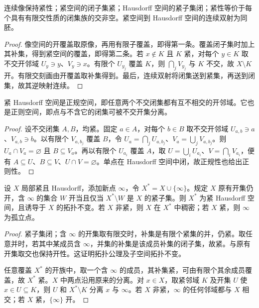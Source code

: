 \begin{proposition}[紧性的基本性质]\label{prop:y0-compact}
连续像保持紧性；紧空间的闭子集紧；Hausdorff 空间的紧子集闭；紧性等价于每个具有有限交性质的闭集族的交非空。紧空间到 Hausdorff 空间的连续双射为同胚。
\end{proposition}
\begin{proof}
像空间的开覆盖取原像，再用有限子覆盖，即得第一条。覆盖闭子集时加上其补集，得到紧空间的覆盖，即得第二条。若 $x\notin K$ 且 $K$ 紧，对每个 $y\in K$ 取不交开邻域 $U_y\ni y$、$V_y\ni x$。有限个 $U_{y_j}$ 覆盖 $K$，则 $\bigcap_jV_{y_j}$ 与 $K$ 不交，故 $X\setminus K$ 开。有限交刻画由开覆盖取补集得到。最后，连续双射将闭集送到紧集，再送到闭集，故其逆映射连续。
\end{proof}

\begin{proposition}\label{prop:y0-normal}
紧 Hausdorff 空间是正规空间，即任意两个不交闭集都有互不相交的开邻域。它也是正则空间，即点与不含它的闭集可被不交开集分离。
\end{proposition}
\begin{proof}
设不交闭集 $A,B$，均紧。固定 $a\in A$，对每个 $b\in B$ 取不交开邻域 $U_{a,b}\ni a$、$V_{a,b}\ni b$。以有限个 $V_{a,b_j}$ 覆盖 $B$，令 $U_a=\bigcap_jU_{a,b_j}$、$V_a=\bigcup_jV_{a,b_j}$。则 $U_a\cap V_a=\varnothing$ 且 $B\subseteq V_a$。再以有限个 $U_{a_i}$ 覆盖 $A$，取 $U=\bigcup_iU_{a_i}$、$V=\bigcap_iV_{a_i}$，便有 $A\subseteq U$、$B\subseteq V$、$U\cap V=\varnothing$。单点在 Hausdorff 空间中闭，故正规性也给出正则性。
\end{proof}

\begin{theorem}[单点紧化]\label{thm:y0-one-point}
设 $X$ 局部紧且 Hausdorff，添加新点 $\infty$，令 $X^*=X\cup\{\infty\}$。规定 $X$ 原有开集仍开，含 $\infty$ 的集合 $W$ 开当且仅当 $X^*\setminus W$ 是 $X$ 的紧子集。则 $X^*$ 为紧 Hausdorff 空间，且诱导于 $X$ 的拓扑不变。若 $X$ 非紧，则 $X$ 在 $X^*$ 中稠密；若 $X$ 紧，则 $\infty$ 为孤立点。
\end{theorem}
\begin{proof}
紧子集闭；含 $\infty$ 的开集取有限交时，补集是有限个紧集的并，仍紧。取任意并时，若其中某成员含 $\infty$，并集的补集是该成员补集的闭子集，故紧。与原有开集取交也保持开性。这证明拓扑公理及子空间拓扑不变。

任意覆盖 $X^*$ 的开族中，取一个含 $\infty$ 的成员，其补集紧，可由有限个其余成员覆盖，故 $X^*$ 紧。$X$ 中两点沿用原来的分离。对 $x\in X$，取紧邻域 $K$ 及开集 $U$ 使 $x\in U\subseteq K$，则 $U$ 和 $X^*\setminus K$ 分离 $x$ 与 $\infty$。若 $X$ 非紧，$\infty$ 的任何邻域都与 $X$ 相交；若 $X$ 紧，$\{\infty\}$ 开。
\end{proof}

